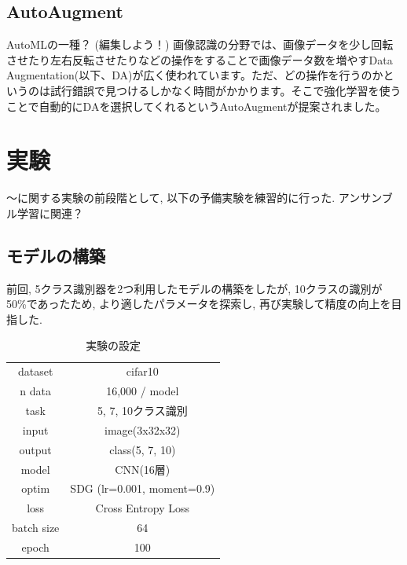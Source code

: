 \documentclass[twocolumn]{jarticle}     %
\begin{document}
\subsection{AutoAugment}
\cite{DBLP:journals/corr/abs-1805-09501}
AutoMLの一種？
(編集しよう！)
画像認識の分野では、画像データを少し回転させたり左右反転させたりなどの操作をすることで画像データ数を増やすData Augmentation(以下、DA)が広く使われています。ただ、どの操作を行うのかというのは試行錯誤で見つけるしかなく時間がかかります。そこで強化学習を使うことで自動的にDAを選択してくれるというAutoAugmentが提案されました。

\section{実験}
～に関する実験の前段階として, 以下の予備実験を練習的に行った.
アンサンブル学習に関連？

\subsection{モデルの構築}
前回, 5クラス識別器を2つ利用したモデルの構築をしたが, 10クラスの識別が50\%であったため, より適したパラメータを探索し, 再び実験して精度の向上を目指した.

\begin{table}[tb]
  \begin{center}
    \caption{実験の設定}
    \begin{tabular}{|c|c|} \hline
      dataset & cifar10 \\
      n data & 16,000 / model \\ \hline
      task & 5, 7, 10クラス識別 \\
      input & image(3x32x32) \\
      output & class(5, 7, 10) \\ \hline
      model & CNN(16層) \\
      optim & SDG (lr=0.001, moment=0.9) \\
      loss & Cross Entropy Loss \\ \hline
      batch size & 64 \\
      epoch & 100 \\ \hline
    \end{tabular}
    \label{tab:setting}
  \end{center}
\end{table}
\end{document}
